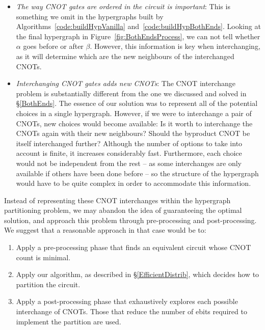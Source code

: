 \begin{itemize}
  \item \textit{The way CNOT gates are ordered in the circuit is important}: This is something we omit in the hypergraphs built by Algorithms~\ref{code:buildHypVanilla} and~\ref{code:buildHypBothEnds}. Looking at the final hypergraph in Figure~\ref{fig:BothEndsProcess}, we can not tell whether \(\alpha\) goes before or after \(\beta\). However, this information is key when interchanging, as it will determine which are the new neighbours of the interchanged CNOTs. %

  \item \textit{Interchanging CNOT gates adds new CNOTs}: The CNOT interchange problem is substantially different from the one we discussed and solved in \S\ref{BothEnds}. The essence of our solution was to represent all of the potential choices in a single hypergraph. However, if we were to interchange a pair of CNOTs, new choices would become available: Is it worth to interchange the CNOTs again with their new neighbours? Should the byproduct CNOT be itself interchanged further? Although the number of options to take into account is finite, it increases considerably fast. Furthermore, each choice would not be independent from the rest -- as some interchanges are only available if others have been done before -- so the structure of the hypergraph would have to be quite complex in order to accommodate this information.
\end{itemize}

Instead of representing these CNOT interchanges within the hypergraph partitioning problem, we may abandon the idea of guaranteeing the optimal solution, and approach this problem through pre-processing and post-processing. We suggest that a reasonable approach in that case would be to:
\begin{enumerate} 
\item Apply a pre-processing phase that finds an equivalent circuit whose CNOT count is minimal.
\item Apply our algorithm, as described in \S\ref{EfficientDistrib}, which decides how to partition the circuit. 
\item Apply a post-processing phase that exhaustively explores each possible interchange of CNOTs. Those that reduce the number of ebits required to implement the partition are used.
\end{enumerate}

